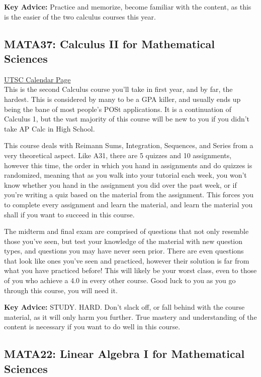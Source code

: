 \documentclass[11pt]{article}
\begin{document}
\textbf{Key Advice:} 
Practice and memorize, become familiar with the content, as this is the
easier of the two calculus courses this year.

\subsection{MATA37: Calculus II for Mathematical Sciences}

\href{https://utsc.calendar.utoronto.ca/course/MATA37H3}{UTSC Calendar Page}\\

This is the second Calculus course you'll take in first year, and by
far, the hardest. This is considered by many to be a GPA killer, and
usually ends up being the bane of most people's POSt applications. It is
a continuation of Calculus 1, but the vast majority of this course will
be new to you if you didn't take AP Calc in High School.

This course deals with Reimann Sums, Integration, Sequences, and Series
from a very theoretical aspect. Like A31, there are 5 quizzes and
10 assignments, however this time, the order in which you hand in
assignments and do quizzes is randomized, meaning that as you walk
into your tutorial each week, you won't know whether you hand in the
assignment you did over the past week, or if you're writing a quiz based
on the material from the assignment. This forces you to complete every
assignment and learn the material, and learn the material you shall if
you want to succeed in this course.

The midterm and final exam are comprised of questions that not only
resemble those you've seen, but test your knowledge of the material
with new question types, and questions you may have never seen prior.
There are even questions that look like ones you've seen and practiced,
however their solution is far from what you have practiced before! This
will likely be your worst class, even to those of you who achieve a 4.0
in every other course. Good luck to you as you go through this course,
you will need it.

\textbf{Key Advice:} 
STUDY. HARD. Don't slack off, or fall behind with the course material,
as it will only harm you further. True mastery and understanding of the
content is necessary if you want to do well in this course.

\subsection{MATA22: Linear Algebra I for Mathematical Sciences}
\end{document}
